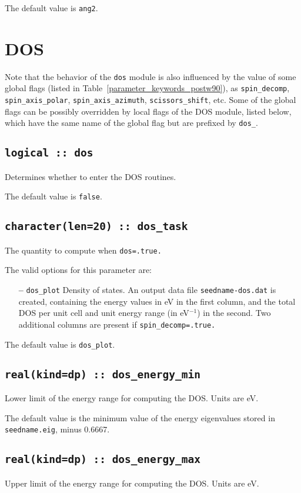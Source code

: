 The default value is {\tt ang2}.

\clearpage
\section{DOS}
Note that the behavior of the \verb#dos# module  is also influenced by
the value of some global flags (listed in
Table~\ref{parameter_keywords_postw90}), as
\verb#spin_decomp#, \verb#spin_axis_polar#, \verb#spin_axis_azimuth#,
\verb#scissors_shift#, etc.
Some of the global flags can be possibly
overridden by local flags of the DOS module, listed below, which have
the same name of the global flag but are prefixed by \verb#dos_#.

\subsection[dos]{\tt logical :: dos}
Determines whether to enter the DOS routines.

The default value is \verb#false#.


\subsection[dos\_task]{\tt character(len=20) ::  dos\_task}
The quantity to compute when {\tt dos=.true.}

The valid options for this parameter are:
\begin{itemize}
\item[{\bf --}] \verb#dos_plot# Density of states. An output data file
  {\tt seedname-dos.dat} is created, containing the energy values in
  eV in the first column, and the total DOS per unit cell and unit
  energy range (in eV$^{-1}$) in the second. Two additional columns
  are present if {\tt spin\_decomp=.true.}
\end{itemize}


The default value is \verb#dos_plot#.


\subsection[dos\_min\_energy]{\tt real(kind=dp) :: dos\_energy\_min}
Lower limit of the energy range for computing the DOS.
Units are eV.

The default value is the minimum value of the energy eigenvalues
stored in {\tt seedname.eig}, minus 0.6667.

\subsection[dos\_max\_energy]{\tt real(kind=dp) :: dos\_energy\_max}
Upper limit of the energy range for computing the DOS.
Units are eV.

